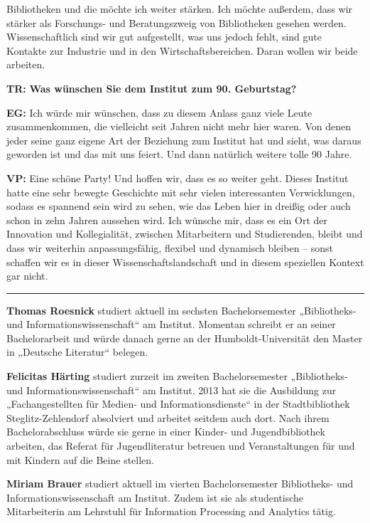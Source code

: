 \documentclass[a4paper,
fontsize=11pt,
oneside,
numbers=noperiodatend,
parskip=half-,
bibliography=totoc,
final
]{scrartcl}
\begin{document}
Bibliotheken und die möchte ich weiter stärken. Ich möchte außerdem,
dass wir stärker als Forschungs- und Beratungszweig von Bibliotheken
gesehen werden. Wissenschaftlich sind wir gut aufgestellt, was uns
jedoch fehlt, sind gute Kontakte zur Industrie und in den
Wirtschaftsbereichen. Daran wollen wir beide arbeiten.

\textbf{TR:} \textbf{Was wünschen Sie dem Institut zum 90. Geburtstag?}

\textbf{EG:} Ich würde mir wünschen, dass zu diesem Anlass ganz viele
Leute zusammenkommen, die vielleicht seit Jahren nicht mehr hier waren.
Von denen jeder seine ganz eigene Art der Beziehung zum Institut hat und
sieht, was daraus geworden ist und das mit uns feiert. Und dann
natürlich weitere tolle 90 Jahre.

\textbf{VP:} Eine schöne Party! Und hoffen wir, dass es so weiter geht.
Dieses Institut hatte eine sehr bewegte Geschichte mit sehr vielen
interessanten Verwicklungen, sodass es spannend sein wird zu sehen, wie
das Leben hier in dreißig oder auch schon in zehn Jahren aussehen wird.
Ich wünsche mir, dass es ein Ort der Innovation und Kollegialität,
zwischen Mitarbeitern und Studierenden, bleibt und dass wir weiterhin
anpassungsfähig, flexibel und dynamisch bleiben -- sonst schaffen wir es
in dieser Wissenschaftslandschaft und in diesem speziellen Kontext gar
nicht.

\begin{center}\rule{0.5\linewidth}{\linethickness}\end{center}

\textbf{Thomas Roesnick} studiert aktuell im sechsten Bachelorsemester
„Bibliotheks- und Informationswissenschaft`` am Institut. Momentan
schreibt er an seiner Bachelorarbeit und würde danach gerne an der
Humboldt-Universität den Master in „Deutsche Literatur`` belegen.

\textbf{Felicitas Härting} studiert zurzeit im zweiten Bachelorsemester
„Bibliotheks- und Informationswissenschaft`` am Institut. 2013 hat sie
die Ausbildung zur „Fachangestellten für Medien- und
Informationsdienste`` in der Stadtbibliothek Steglitz-Zehlendorf
absolviert und arbeitet seitdem auch dort. Nach ihrem Bachelorabschluss
würde sie gerne in einer Kinder- und Jugendbibliothek arbeiten, das
Referat für Jugendliteratur betreuen und Veranstaltungen für und mit
Kindern auf die Beine stellen.

\textbf{Miriam Brauer} studiert aktuell im vierten Bachelorsemester
Bibliotheks- und Informationswissenschaft am Institut. Zudem ist sie als
studentische Mitarbeiterin am Lehrstuhl für Information Processing and
Analytics tätig.
\end{document}
